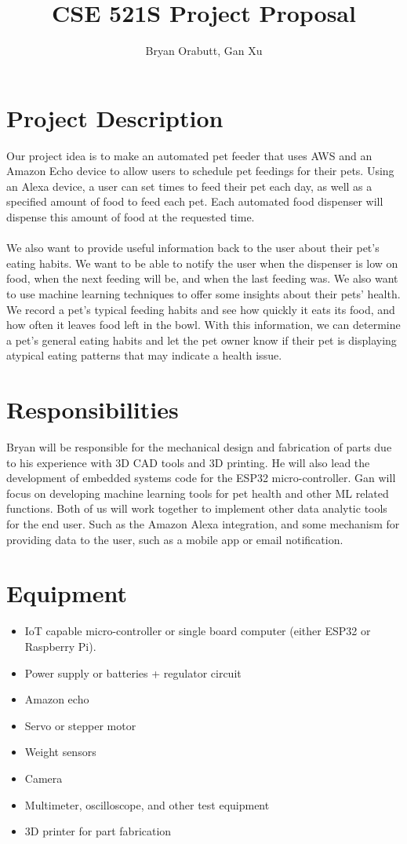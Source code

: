 \documentclass{article}
\title{CSE 521S Project Proposal}
\author{Bryan Orabutt, Gan Xu}
\begin{document}
\maketitle 
\newpage
\section*{Project Description}

Our project idea is to make an automated pet feeder that uses AWS and an Amazon Echo device to allow users to schedule pet feedings for their pets. Using an Alexa device, a user can set times to feed their pet each day, as well as a specified amount of food to feed each pet. Each automated food dispenser will dispense this amount of food at the requested time.\\\\\noindent
We also want to provide useful information back to the user about their pet's eating habits. We want to be able to notify the user when the dispenser is low on food, when the next feeding will be, and when the last feeding was. We also want to use machine learning techniques to offer some insights about their pets' health. We record a pet's typical feeding habits and see how quickly it eats its food, and how often it leaves food left in the bowl. With this information, we can determine a pet's general eating habits and let the pet owner know if their pet is displaying atypical eating patterns that may indicate a health issue.

\section*{Responsibilities}
Bryan will be responsible for the mechanical design and fabrication of parts due to his experience with 3D CAD tools and 3D printing. He will also lead the development of embedded systems code for the ESP32 micro-controller.  Gan will focus on developing machine learning tools for pet health and other ML related functions. Both of us will work together to implement other data analytic tools for the end user. Such as the Amazon Alexa integration, and some mechanism for providing data to the user, such as a mobile app or email notification.

\section*{Equipment}
\begin{itemize}
\item IoT capable micro-controller or single board computer (either ESP32 or Raspberry Pi).
\item Power supply or batteries + regulator circuit
\item Amazon echo
\item Servo or stepper motor
\item Weight sensors
\item Camera
\item Multimeter, oscilloscope, and other test equipment
\item 3D printer for part fabrication
\end{itemize}
\end{document}

